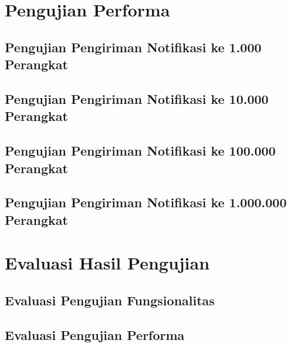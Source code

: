 \section{Pengujian Performa}

\subsection{Pengujian Pengiriman Notifikasi ke 1.000 Perangkat}

\subsection{Pengujian Pengiriman Notifikasi ke 10.000 Perangkat}

\subsection{Pengujian Pengiriman Notifikasi ke 100.000 Perangkat}

\subsection{Pengujian Pengiriman Notifikasi ke 1.000.000 Perangkat}

\section{Evaluasi Hasil Pengujian}

\subsection{Evaluasi Pengujian Fungsionalitas}

\subsection{Evaluasi Pengujian Performa}
